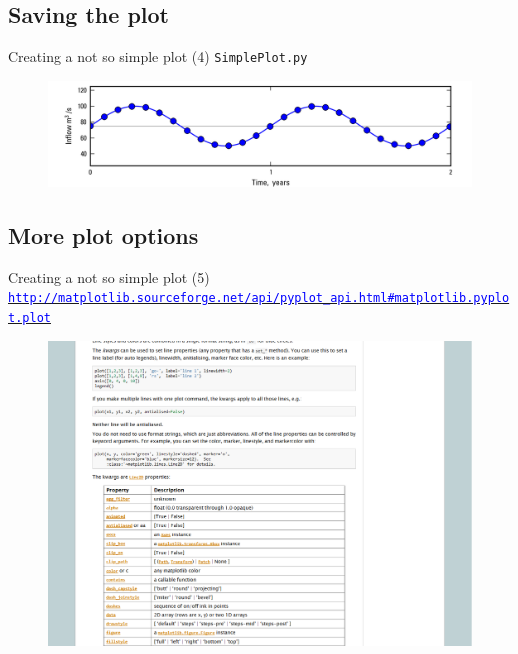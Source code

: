 \documentclass[t]{beamer}
\begin{document}
\subsection{Saving the plot}
\begin{frame}{Creating a not so simple plot (4)}
	\small{\texttt{SimplePlot.py}}
	\vspace{-15pt}\begin{figure}[ht]
		\centering
        	\lstset{numbers=left}
        	
	\end{figure}
	\vspace{-30pt}\begin{figure}[ht]
		\centering
		\includegraphics[width=4.5in]{figures/Inflow.png}
	\end{figure}
\end{frame}

\subsection{More plot options}
\begin{frame}{Creating a not so simple plot (5)}
	 \href{http://matplotlib.sourceforge.net/api/pyplot\_api.html\#matplotlib.pyplot.plot}{\texttt{\tiny{\textcolor{blue}{http://matplotlib.sourceforge.net/api/pyplot\_api.html\#matplotlib.pyplot.plot}}}}
	\begin{figure}[ht]
		\centering
		\includegraphics[scale=0.75]{figures/matplotlib_plot_kwargs.png}
	\end{figure}
\end{frame}
\end{document}
